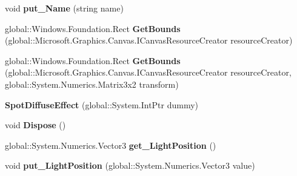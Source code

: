 \begin{DoxyCompactItemize}
void {\bfseries put\+\_\+\+Name} (string name)
\item 
\mbox{\label{class_microsoft_1_1_graphics_1_1_canvas_1_1_effects_1_1_spot_diffuse_effect_a69c0c17aa611778dd2e2b32293e37614}} 
global\+::\+Windows.\+Foundation.\+Rect {\bfseries Get\+Bounds} (global\+::\+Microsoft.\+Graphics.\+Canvas.\+I\+Canvas\+Resource\+Creator resource\+Creator)
\item 
\mbox{\label{class_microsoft_1_1_graphics_1_1_canvas_1_1_effects_1_1_spot_diffuse_effect_ac221cecc5ef487645395a4d4e165ea3d}} 
global\+::\+Windows.\+Foundation.\+Rect {\bfseries Get\+Bounds} (global\+::\+Microsoft.\+Graphics.\+Canvas.\+I\+Canvas\+Resource\+Creator resource\+Creator, global\+::\+System.\+Numerics.\+Matrix3x2 transform)
\item 
\mbox{\label{class_microsoft_1_1_graphics_1_1_canvas_1_1_effects_1_1_spot_diffuse_effect_a1793ac01d2b7fcfb4c8585ffa6e4fe3e}} 
{\bfseries Spot\+Diffuse\+Effect} (global\+::\+System.\+Int\+Ptr dummy)
\item 
\mbox{\label{class_microsoft_1_1_graphics_1_1_canvas_1_1_effects_1_1_spot_diffuse_effect_aafe044ef81617030138a79156a50e0df}} 
void {\bfseries Dispose} ()
\item 
\mbox{\label{class_microsoft_1_1_graphics_1_1_canvas_1_1_effects_1_1_spot_diffuse_effect_a8633fde2eefa69e9fe028b4a634a7b91}} 
global\+::\+System.\+Numerics.\+Vector3 {\bfseries get\+\_\+\+Light\+Position} ()
\item 
\mbox{\label{class_microsoft_1_1_graphics_1_1_canvas_1_1_effects_1_1_spot_diffuse_effect_a273cd23de4a16fa2d125bb84bb4da4c6}} 
void {\bfseries put\+\_\+\+Light\+Position} (global\+::\+System.\+Numerics.\+Vector3 value)
\item 
\mbox{\label{class_microsoft_1_1_graphics_1_1_canvas_1_1_effects_1_1_spot_diffuse_effect_a4f0749b0adfa160bd1a9f1bfa468570a}} 

\end{DoxyCompactItemize}
